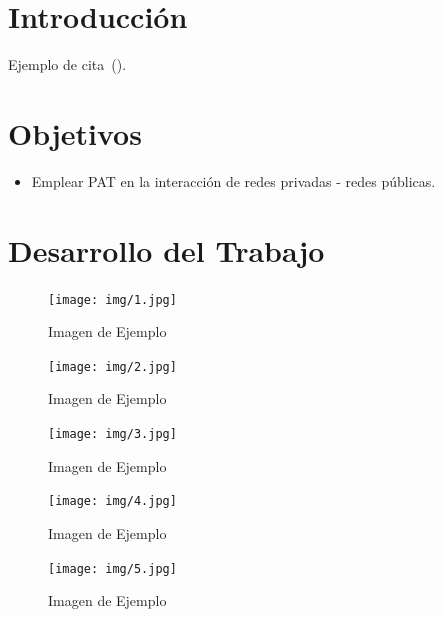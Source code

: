 \setcounter{page}{1}

\section{Introducción}
    Ejemplo de cita~(\cite{buffett84}).
\section{Objetivos}
    \begin{itemize}
        \item Emplear PAT en la interacción de redes privadas - redes públicas.
    \end{itemize}

\section{Desarrollo del Trabajo}

    \begin{figure}[H]
        \centering
        \texttt{[image: img/1.jpg]}
        \caption{Imagen de Ejemplo}
        \label{fig:Imagen_Ejemplo1}
    \end{figure}

    \begin{figure}[H]
        \centering
        \texttt{[image: img/2.jpg]}
        \caption{Imagen de Ejemplo}
        \label{fig:Imagen_Ejemplo2}
    \end{figure}

    \begin{figure}[H]
        \centering
        \texttt{[image: img/3.jpg]}
        \caption{Imagen de Ejemplo}
        \label{fig:Imagen_Ejemplo3}
    \end{figure}

    \begin{figure}[H]
        \centering
        \texttt{[image: img/4.jpg]}
        \caption{Imagen de Ejemplo}
        \label{fig:Imagen_Ejemplo4}
    \end{figure}

    \begin{figure}[H]
        \centering
        \texttt{[image: img/5.jpg]}
        \caption{Imagen de Ejemplo}
        \label{fig:Imagen_Ejemplo5}
    \end{figure}

